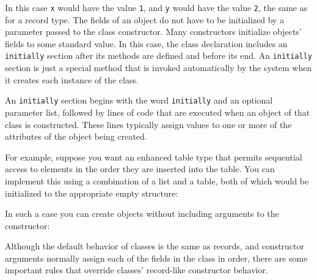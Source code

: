 In this case \texttt{x} would have the value \texttt{1}, and \texttt{y}
would have the value \texttt{2}, the same as for a record
type. The fields of an object do not have to be initialized by a
parameter passed to the class constructor. Many constructors initialize
objects' fields to some standard value. In this case,
the class declaration includes an \texttt{initially}
section after its methods are defined and before its end. An
\texttt{initially} section is just a special method that is invoked
automatically by the system when it creates each instance of the class.

An \texttt{initially} section begins with the word \texttt{initially}
and an optional parameter list, followed by lines of code that are
executed when an object of that class is constructed.  These lines
typically assign values to one or more of the attributes of the object
being created.

For example, suppose you want an enhanced table type that permits
sequential access to elements in the order they are inserted into the
table. You can implement this using a combination of a list and a
table, both of which would be initialized to the appropriate empty
structure: 


\noindent
In such a case you can create objects without including arguments to the
constructor: 


Although the default behavior of classes is the same as records, and
constructor arguments normally assign each of the fields in the class
in order, there are some important rules that override classes'
record-like constructor behavior.

